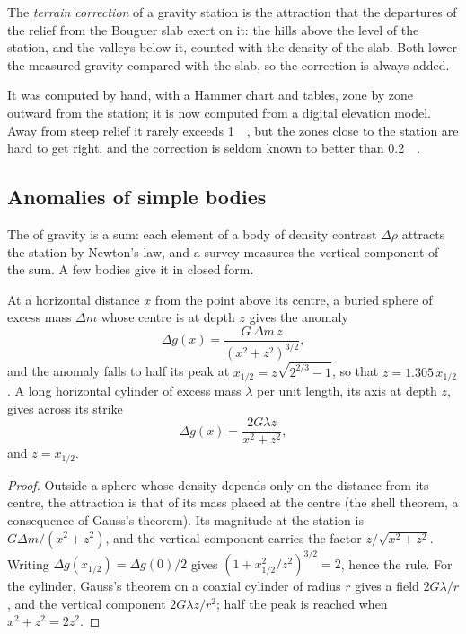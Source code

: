 \begin{definition}\label{def:b3:field-lab-methods-3:terrain}
The \emph{terrain correction} of a gravity
station is the attraction that the departures of the relief from the
Bouguer slab exert on it: the hills above the level of the station, and
the valleys below it, counted with the density of the slab. Both lower
the measured gravity compared with the slab, so the correction is
always added.
\end{definition}

It was computed by hand, with a Hammer chart and tables, zone by zone
outward from the station; it is now computed from a digital elevation
model. Away from steep relief it rarely exceeds \qty{1}{\milli\gal},
but the zones close to the station are hard to get right, and the
correction is seldom known to better than \qty{0.2}{\milli\gal}.

\subsection{Anomalies of simple bodies}

The  of gravity is a sum: each element of a body of
density contrast $\Delta\rho$ attracts the station by Newton's law, and
a survey measures the vertical component of the sum. A few bodies give
it in closed form.

\begin{theorem}\label{thm:b3:field-lab-methods-3:sphere}
At a horizontal distance $x$ from the point above its centre, a buried
sphere of excess mass $\Delta m$ whose centre is at depth $z$ gives the
anomaly
\[
\Delta g(x) = \frac{G\,\Delta m\,z}{(x^2 + z^2)^{3/2}} ,
\]
and the anomaly falls to half its peak at $x_{1/2} = z\sqrt{2^{2/3} - 1}$,
so that $z = 1.305\,x_{1/2}$. A long horizontal cylinder of excess mass
$\lambda$ per unit length, its axis at depth $z$, gives across its
strike
\[
\Delta g(x) = \frac{2G\lambda z}{x^2 + z^2} ,
\]
and $z = x_{1/2}$.
\end{theorem}

\begin{proof}
Outside a sphere whose density depends only on the distance from its
centre, the attraction is that of its mass placed at the centre (the
shell theorem, a consequence of Gauss's theorem). Its magnitude at the
station is $G\Delta m/(x^2 + z^2)$, and the vertical component carries
the factor $z/\sqrt{x^2 + z^2}$. Writing $\Delta g(x_{1/2}) =
\Delta g(0)/2$ gives $(1 + x_{1/2}^2/z^2)^{3/2} = 2$, hence the rule. For
the cylinder, Gauss's theorem on a coaxial cylinder of radius $r$ gives
a field $2G\lambda/r$, and the vertical component $2G\lambda z/r^2$;
half the peak is reached when $x^2 + z^2 = 2z^2$.
\end{proof}

